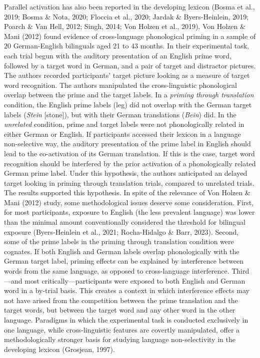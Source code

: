 \documentclass[
  12pt,
  b5paperpaper,
  twoside]{scrreprt}
\begin{document}
Parallel activation has also been reported in the developing lexicon
(Bosma et al., 2019; Bosma \& Nota, 2020; Floccia et al., 2020; Jardak
\& Byers-Heinlein, 2019; Poarch \& Van Hell, 2012; Singh, 2014; Von
Holzen et al., 2019). Von Holzen \& Mani (2012) found evidence of
cross-language phonological priming in a sample of 20 German-English
bilinguals aged 21 to 43 months. In their experimental task, each trial
begun with the auditory presentation of an English prime word, followed
by a target word in German, and a pair of target and distractor
pictures. The authors recorded participants' target picture looking as a
measure of target word recognition. The authors manipulated the
cross-linguistic phonological overlap between the prime and the target
labels. In a \emph{priming through translation} condition, the English
prime labels (leg) did not overlap with the German target labels
(\emph{Stein} {[}stone{]}), but with their German translations
(\emph{Bein}) did. In the \emph{unrelated} condition, prime and target
labels were not phonologically related in either German or English. If
participants accessed their lexicon in a language non-selective way, the
auditory presentation of the prime label in English should lead to the
co-activation of its German translation. If this is the case, target
word recognition should be interfered by the prior activation of a
phonologically related German prime label. Under this hypothesis, the
authors anticipated an delayed target looking in priming through
translation trials, compared to unrelated trials. The results supported
this hypothesis. In spite of the relevance of Von Holzen \& Mani (2012)
study, some methodological issues deserve some consideration. First, for
most participants, exposure to English (the less prevalent language) was
lower than the minimal amount conventionally considered the threshold
for bilingual exposure (Byers-Heinlein et al., 2021; Rocha-Hidalgo \&
Barr, 2023). Second, some of the prime labels in the priming through
translation condition were cognates. If both English and German labels
overlap phonologically with the German target label, priming effects can
be explained by interference between words from the same language, as
opposed to cross-language interference. Third---and most
critically---participants were exposed to both English and German word
in a by-trial basis. This creates a context in which interference
effects may not have arised from the competition between the prime
translation and the target words, but between the target word and any
other word in the other language. Paradigms in which the experimental
task is conducted exclusively in one language, while cross-linguistic
features are covertly manipulated, offer a methodologically stronger
basis for studying language non-selectivity in the developing lexicon
(Grosjean, 1997).
\end{document}
